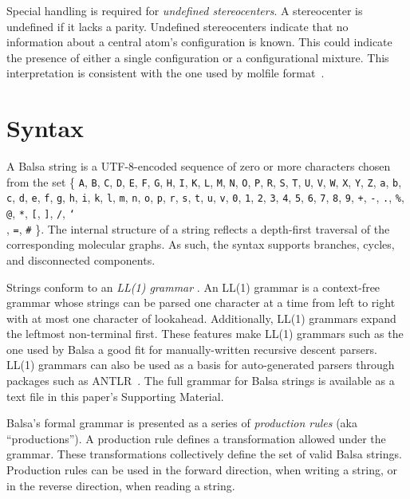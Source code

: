 \documentclass{article}
\def\ttt{\texttt}
\begin{document}
Special handling is required for \textit{undefined stereocenters}. A stereocenter is undefined if it lacks a parity. Undefined stereocenters indicate that no information about a central atom's configuration is known. This could indicate the presence of either a single configuration or a configurational mixture. This interpretation is consistent with the one used by molfile format~\cite{ctfileFormats}.

\section*{Syntax}

A Balsa string is a UTF-8-encoded sequence of zero or more characters chosen from the set \{ \ttt{A}, \ttt{B}, \ttt{C}, \ttt{D}, \ttt{E}, \ttt{F}, \ttt{G}, \ttt{H}, \ttt{I}, \ttt{K}, \ttt{L}, \ttt{M}, \ttt{N}, \ttt{O}, \ttt{P}, \ttt{R}, \ttt{S}, \ttt{T}, \ttt{U}, \ttt{V}, \ttt{W}, \ttt{X}, \ttt{Y}, \ttt{Z}, \ttt{a}, \ttt{b}, \ttt{c}, \ttt{d}, \ttt{e}, \ttt{f}, \ttt{g}, \ttt{h}, \ttt{i}, \ttt{k}, \ttt{l}, \ttt{m}, \ttt{n}, \ttt{o}, \ttt{p}, \ttt{r}, \ttt{s}, \ttt{t}, \ttt{u}, \ttt{v}, \ttt{0}, \ttt{1}, \ttt{2}, \ttt{3}, \ttt{4}, \ttt{5}, \ttt{6}, \ttt{7}, \ttt{8}, \ttt{9}, \ttt{+}, \ttt{-}, \ttt{.}, \ttt{\%}, \ttt{@}, \ttt{*}, \ttt{[}, \ttt{]}, \ttt{/}, \ttt{\char`\\}, \ttt{=}, \ttt{\#} \}. The internal structure of a string reflects a depth-first traversal of the corresponding molecular graphs. As such, the syntax supports branches, cycles, and disconnected components.

Strings conform to an \textit{LL(1) grammar} \cite{thain:2020}. An LL(1) grammar is a context-free grammar whose strings can be parsed one character at a time from left to right with at most one character of lookahead. Additionally, LL(1) grammars expand the leftmost non-terminal first. These features make LL(1) grammars such as the one used by Balsa a good fit for manually-written recursive descent parsers. LL(1) grammars can also be used as a basis for auto-generated parsers through packages such as ANTLR~\cite{parr:2014}. The full grammar for Balsa strings is available as a text file in this paper's Supporting Material.

Balsa's formal grammar is presented as a series of \textit{production rules} (aka \enquote{productions}). A production rule defines a transformation allowed under the grammar. These transformations collectively define the set of valid Balsa strings. Production rules can be used in the forward direction, when writing a string, or in the reverse direction, when reading a string. 
\end{document}
